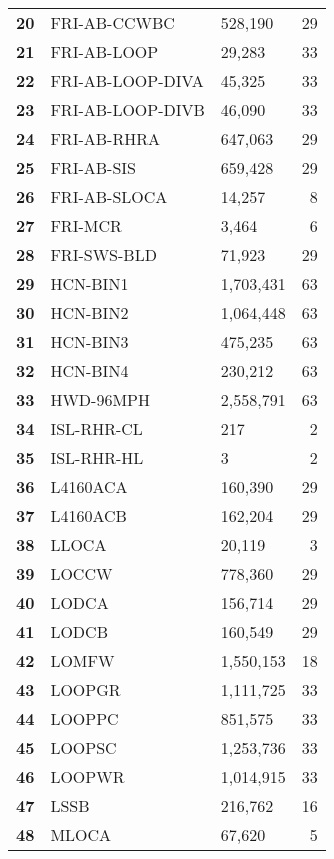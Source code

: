 \begin{longtable}{@{}rllr@{}}
\textbf{20} & FRI-AB-CCWBC     & 528,190   & 29 \\
\textbf{21} & FRI-AB-LOOP      & 29,283    & 33 \\
\textbf{22} & FRI-AB-LOOP-DIVA & 45,325    & 33 \\
\textbf{23} & FRI-AB-LOOP-DIVB & 46,090    & 33 \\
\textbf{24} & FRI-AB-RHRA      & 647,063   & 29 \\
\textbf{25} & FRI-AB-SIS       & 659,428   & 29 \\
\textbf{26} & FRI-AB-SLOCA     & 14,257    & 8  \\
\textbf{27} & FRI-MCR          & 3,464     & 6  \\
\textbf{28} & FRI-SWS-BLD      & 71,923    & 29 \\
\textbf{29} & HCN-BIN1         & 1,703,431 & 63 \\
\textbf{30} & HCN-BIN2         & 1,064,448 & 63 \\
\textbf{31} & HCN-BIN3         & 475,235   & 63 \\
\textbf{32} & HCN-BIN4         & 230,212   & 63 \\
\textbf{33} & HWD-96MPH        & 2,558,791 & 63 \\
\textbf{34} & ISL-RHR-CL       & 217       & 2  \\
\textbf{35} & ISL-RHR-HL       & 3         & 2  \\
\textbf{36} & L4160ACA         & 160,390   & 29 \\
\textbf{37} & L4160ACB         & 162,204   & 29 \\
\textbf{38} & LLOCA            & 20,119    & 3  \\
\textbf{39} & LOCCW            & 778,360   & 29 \\
\textbf{40} & LODCA            & 156,714   & 29 \\
\textbf{41} & LODCB            & 160,549   & 29 \\
\textbf{42} & LOMFW            & 1,550,153 & 18 \\
\textbf{43} & LOOPGR           & 1,111,725 & 33 \\
\textbf{44} & LOOPPC           & 851,575   & 33 \\
\textbf{45} & LOOPSC           & 1,253,736 & 33 \\
\textbf{46} & LOOPWR           & 1,014,915 & 33 \\
\textbf{47} & LSSB             & 216,762   & 16 \\
\textbf{48} & MLOCA            & 67,620    & 5  \\

\end{longtable}
